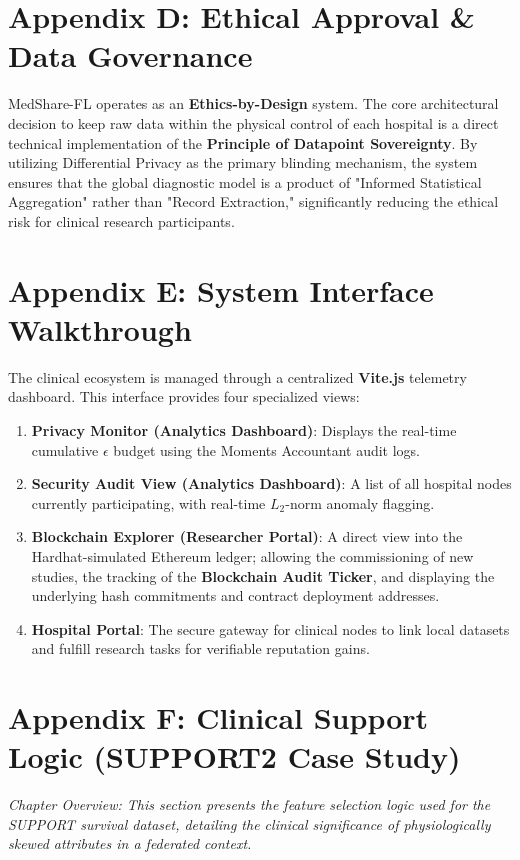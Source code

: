 \documentclass[10pt, a4paper, twocolumn]{article}
\begin{document}
\section*{Appendix D: Ethical Approval \& Data Governance}
MedShare-FL operates as an \textbf{Ethics-by-Design} system. The core architectural decision to keep raw data within the physical control of each hospital is a direct technical implementation of the \textbf{Principle of Datapoint Sovereignty}. By utilizing Differential Privacy as the primary blinding mechanism, the system ensures that the global diagnostic model is a product of "Informed Statistical Aggregation" rather than "Record Extraction," significantly reducing the ethical risk for clinical research participants.

\section*{Appendix E: System Interface Walkthrough}
The clinical ecosystem is managed through a centralized \textbf{Vite.js} telemetry dashboard. This interface provides four specialized views:
\begin{enumerate}
    \item \textbf{Privacy Monitor (Analytics Dashboard)}: Displays the real-time cumulative $\epsilon$ budget using the Moments Accountant audit logs.
    \item \textbf{Security Audit View (Analytics Dashboard)}: A list of all hospital nodes currently participating, with real-time $L_2$-norm anomaly flagging.
    \item \textbf{Blockchain Explorer (Researcher Portal)}: A direct view into the Hardhat-simulated Ethereum ledger; allowing the commissioning of new studies, the tracking of the \textbf{Blockchain Audit Ticker}, and displaying the underlying hash commitments and contract deployment addresses.
    \item \textbf{Hospital Portal}: The secure gateway for clinical nodes to link local datasets and fulfill research tasks for verifiable reputation gains.
\end{enumerate}

\section*{Appendix F: Clinical Support Logic (SUPPORT2 Case Study)}
\textit{Chapter Overview: This section presents the feature selection logic used for the SUPPORT survival dataset, detailing the clinical significance of physiologically skewed attributes in a federated context.}
\end{document}
